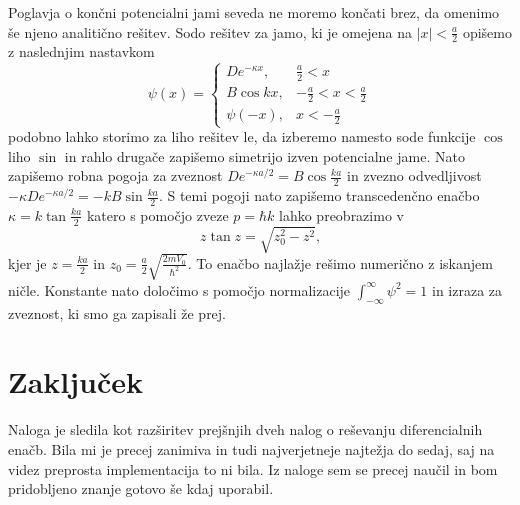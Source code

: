 \documentclass{article}
\begin{document}
\medskip

Poglavja o končni potencialni jami seveda ne moremo končati brez, da omenimo še njeno analitično rešitev. Sodo rešitev za jamo, ki je omejena na $|x|<\frac{a}{2}$ opišemo z naslednjim nastavkom
\begin{equation}
\psi(x) = \begin{cases} 
De^{-\kappa x}, & \frac{a}{2} < x \\
B\cos kx, & -\frac{a}{2} < x < \frac{a}{2} \\
\psi(-x), & x < -\frac{a}{2}
\end{cases}
\end{equation}
podobno lahko storimo za liho rešitev le, da izberemo namesto sode funkcije $\cos$ liho $\sin$ in rahlo drugače zapišemo simetrijo izven potencialne jame. Nato zapišemo robna pogoja za zveznost $D e^{-\kappa a/2}= B \cos{\frac{ka}{2}}$ in zvezno odvedljivost $-\kappa D e^{-\kappa a / 2} = - k B \sin{\frac{ka}{2}}$. S temi pogoji nato zapišemo transcedenčno enačbo $\kappa = k \tan{\frac{ka}{2}}$ katero s pomočjo zveze $p=\hbar k$ lahko preobrazimo v 
\begin{equation}
	z\tan{z} = \sqrt{z_0^2 - z^2}\text{,}
\end{equation}
kjer je $z = \frac{ka}{2}$ in $z_0=\frac{a}{2}\sqrt{\frac{2mV_0}{\hbar^2}}$. To enačbo najlažje rešimo numerično z iskanjem ničle. Konstante nato določimo s pomočjo normalizacije $\int^{\infty}_{-\infty}\psi^2=1$ in izraza za zveznost, ki smo ga zapisali že prej.
\section{Zaključek}
Naloga je sledila kot razširitev prejšnjih dveh nalog o reševanju diferencialnih enačb. Bila mi je precej zanimiva in tudi najverjetneje najtežja do sedaj, saj na videz preprosta implementacija to ni bila. Iz naloge sem se precej naučil in bom pridobljeno znanje gotovo še kdaj uporabil.
\end{document}

